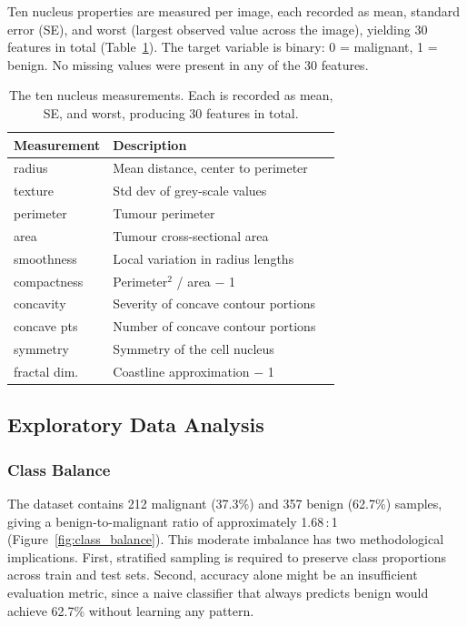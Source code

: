 \documentclass[twocolumn, fontsize=10pt]{article}
\begin{document}
Ten nucleus properties are measured per image, each recorded as mean, standard error (SE), and worst (largest observed value across the image), yielding 30 features in total (Table~\ref{tab:feature_groups}). The target variable is binary: 0 = malignant, 1 = benign. No missing values were present in any of the 30 features.

\begin{table}[H]
\centering
\small
\setlength{\tabcolsep}{3pt}
\begin{tabular}{llp{3.8cm}}
\toprule
\textbf{Measurement} & \textbf{Description} \\
\midrule
radius    & Mean distance, center to perimeter \\
texture & Std dev of grey-scale values \\
perimeter  & Tumour perimeter \\
area       & Tumour cross-sectional area \\
smoothness & Local variation in radius lengths \\
compactness & Perimeter$^2$ / area $-$ 1 \\
concavity  & Severity of concave contour portions \\
concave pts  & Number of concave contour portions \\
symmetry   & Symmetry of the cell nucleus \\
fractal dim. & Coastline approximation $-$ 1 \\
\bottomrule
\end{tabular}
\caption{The ten nucleus measurements. Each is recorded as mean, SE, and worst, producing 30 features in total.}
\label{tab:feature_groups}
\end{table}


\subsection{Exploratory Data Analysis}

\subsubsection{Class Balance}

The dataset contains 212 malignant (37.3\%) and 357 benign (62.7\%) samples, giving a benign-to-malignant ratio of approximately 1.68\,:\,1 (Figure~\ref{fig:class_balance}). This moderate imbalance has two methodological implications. First, stratified sampling is required to preserve class proportions across train and test sets. Second, accuracy alone might be an insufficient evaluation metric, since a naive classifier that always predicts benign would achieve 62.7\% without learning any pattern.
\end{document}

